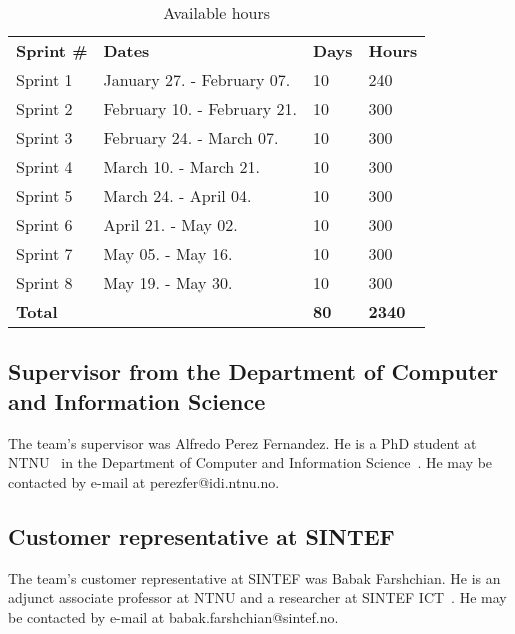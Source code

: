 \begin{table}[H]
\centering
{}
\begin{tabular}{|l|l|l|l|}
\hline
\textbf{Sprint \#} & \textbf{Dates} & \textbf{Days} & \textbf{Hours}\\
Sprint 1& January 27. - February 07. & 10  & 240 \\
Sprint 2 & February 10. - February 21. &10  & 300 \\
Sprint 3 & February 24. - March 07. &10 & 300 \\
Sprint 4 & March 10. - March 21. &10  &300 \\
Sprint 5 & March 24. - April 04. &10&  300 \\
Sprint 6 & April 21. - May 02. &10  &300 \\
Sprint 7 & May 05. - May 16. &10  &300 \\
Sprint 8 & May 19. - May 30. &10  &300 \\
\textbf{Total}&& \textbf{80}&  \textbf{2340}\\\hline
\end{tabular}
\caption{Available hours}
\label{tab:availHours}
\end{table}



\subsection{Supervisor from the Department of Computer and Information Science}
The team's supervisor was Alfredo Perez Fernandez. He is a PhD student at NTNU~\cite{ntnu} in the Department of Computer and Information Science~\cite{idi}. He may be contacted by e-mail at perezfer@idi.ntnu.no.

\subsection{Customer representative at SINTEF}
The team's customer representative at SINTEF was Babak Farshchian. He is an adjunct associate professor at NTNU and a researcher at SINTEF ICT~\cite{sintefict}. He may be contacted by e-mail at babak.farshchian@sintef.no.
